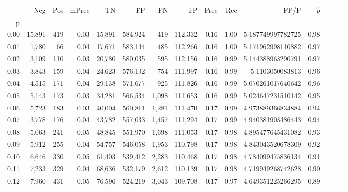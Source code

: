 \begin{tabular}{rrrrrrrrrrrrrrr}
\toprule
{} &     Neg &    Pos & mPrec &       TN &       FP &       FN &       TP &  Prec &   Rec &                 FP/P & $\hat{p}$ \\
p    &         &        &       &          &          &          &          &       &       &                      &           \\
\midrule
0.00 &  15,891 &    419 &  0.03 &   15,891 &  584,924 &      419 &  112,332 &  0.16 &  1.00 &    5.187749997782725 &      0.98 \\
0.01 &   1,780 &     66 &  0.04 &   17,671 &  583,144 &      485 &  112,266 &  0.16 &  1.00 &    5.171962998110882 &      0.97 \\
0.02 &   3,109 &    110 &  0.03 &   20,780 &  580,035 &      595 &  112,156 &  0.16 &  0.99 &    5.144388963290791 &      0.97 \\
0.03 &   3,843 &    159 &  0.04 &   24,623 &  576,192 &      754 &  111,997 &  0.16 &  0.99 &      5.1103050083813 &      0.96 \\
0.04 &   4,515 &    171 &  0.04 &   29,138 &  571,677 &      925 &  111,826 &  0.16 &  0.99 &    5.070261017640642 &      0.96 \\
0.05 &   5,143 &    173 &  0.03 &   34,281 &  566,534 &    1,098 &  111,653 &  0.16 &  0.99 &    5.024647231510142 &      0.95 \\
0.06 &   5,723 &    183 &  0.03 &   40,004 &  560,811 &    1,281 &  111,470 &  0.17 &  0.99 &    4.973889366834884 &      0.94 \\
0.07 &   3,778 &    176 &  0.04 &   43,782 &  557,033 &    1,457 &  111,294 &  0.17 &  0.99 &    4.940381903486443 &      0.94 \\
0.08 &   5,063 &    241 &  0.05 &   48,845 &  551,970 &    1,698 &  111,053 &  0.17 &  0.98 &    4.895477645431082 &      0.93 \\
0.09 &   5,912 &    255 &  0.04 &   54,757 &  546,058 &    1,953 &  110,798 &  0.17 &  0.98 &    4.843043520678309 &      0.92 \\
0.10 &   6,646 &    330 &  0.05 &   61,403 &  539,412 &    2,283 &  110,468 &  0.17 &  0.98 &    4.784099475836134 &      0.91 \\
0.11 &   7,233 &    329 &  0.04 &   68,636 &  532,179 &    2,612 &  110,139 &  0.17 &  0.98 &    4.719949268742628 &      0.90 \\
0.12 &   7,960 &    431 &  0.05 &   76,596 &  524,219 &    3,043 &  109,708 &  0.17 &  0.97 &    4.649351225266295 &      0.89 \\

\end{tabular}
